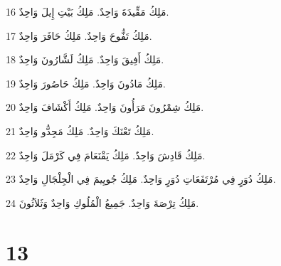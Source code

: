 \par 16 مَلِكُ مَقِّيدَةَ وَاحِدٌ. مَلِكُ بَيْتِ إِيلَ وَاحِدٌ.
\par 17 مَلِكُ تَفُّوحَ وَاحِدٌ. مَلِكُ حَافَرَ وَاحِدٌ.
\par 18 مَلِكُ أَفِيقَ وَاحِدٌ. مَلِكُ لَشَّارُونَ وَاحِدٌ.
\par 19 مَلِكُ مَادُونَ وَاحِدٌ. مَلِكُ حَاصُورَ وَاحِدٌ.
\par 20 مَلِكُ شِمْرُونَ مَرَأُونَ وَاحِدٌ. مَلِكُ أَكْشَافَ وَاحِدٌ.
\par 21 مَلِكُ تَعْنَكَ وَاحِدٌ. مَلِكُ مَجِدُّو وَاحِدٌ.
\par 22 مَلِكُ قَادِشَ وَاحِدٌ. مَلِكُ يَقْنَعَامَ فِي كَرْمَلَ وَاحِدٌ.
\par 23 مَلِكُ دُوَرٍ فِي مُرْتَفَعَاتِ دُوَرٍ وَاحِدٌ. مَلِكُ جُويِيمَ فِي الْجِلْجَالِ وَاحِدٌ.
\par 24 مَلِكُ تِرْصَةَ وَاحِدٌ. جَمِيعُ الْمُلُوكِ وَاحِدٌ وَثَلاَثُونَ.

\chapter{13}

